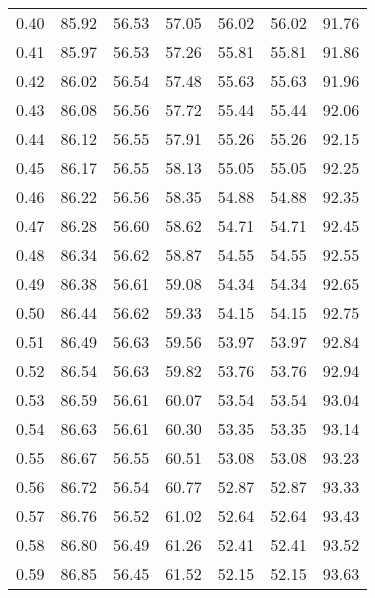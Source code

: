 \begin{tabular}{|c|c|c|c|c|c|c|}
      0.40 &     85.92 &     56.53 &      57.05 &   56.02 &      56.02 &         91.76 \\
      0.41 &     85.97 &     56.53 &      57.26 &   55.81 &      55.81 &         91.86 \\
      0.42 &     86.02 &     56.54 &      57.48 &   55.63 &      55.63 &         91.96 \\
      0.43 &     86.08 &     56.56 &      57.72 &   55.44 &      55.44 &         92.06 \\
      0.44 &     86.12 &     56.55 &      57.91 &   55.26 &      55.26 &         92.15 \\
      0.45 &     86.17 &     56.55 &      58.13 &   55.05 &      55.05 &         92.25 \\
      0.46 &     86.22 &     56.56 &      58.35 &   54.88 &      54.88 &         92.35 \\
      0.47 &     86.28 &     56.60 &      58.62 &   54.71 &      54.71 &         92.45 \\
      0.48 &     86.34 &     56.62 &      58.87 &   54.55 &      54.55 &         92.55 \\
      0.49 &     86.38 &     56.61 &      59.08 &   54.34 &      54.34 &         92.65 \\
      0.50 &     86.44 &     56.62 &      59.33 &   54.15 &      54.15 &         92.75 \\
      0.51 &     86.49 &     56.63 &      59.56 &   53.97 &      53.97 &         92.84 \\
      0.52 &     86.54 &     56.63 &      59.82 &   53.76 &      53.76 &         92.94 \\
      0.53 &     86.59 &     56.61 &      60.07 &   53.54 &      53.54 &         93.04 \\
      0.54 &     86.63 &     56.61 &      60.30 &   53.35 &      53.35 &         93.14 \\
      0.55 &     86.67 &     56.55 &      60.51 &   53.08 &      53.08 &         93.23 \\
      0.56 &     86.72 &     56.54 &      60.77 &   52.87 &      52.87 &         93.33 \\
      0.57 &     86.76 &     56.52 &      61.02 &   52.64 &      52.64 &         93.43 \\
      0.58 &     86.80 &     56.49 &      61.26 &   52.41 &      52.41 &         93.52 \\
      0.59 &     86.85 &     56.45 &      61.52 &   52.15 &      52.15 &         93.63 \\

\end{tabular}
